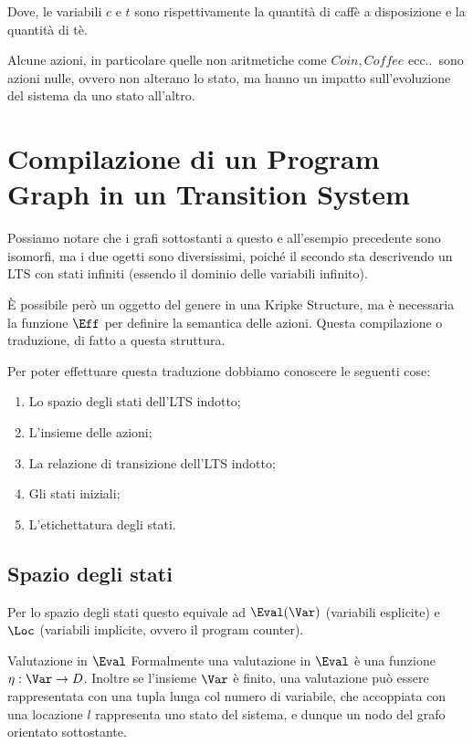 Dove, le variabili \(c\) e \(t\) sono rispettivamente la quantità di caffè a disposizione e la quantità di tè.

Alcune azioni, in particolare quelle non aritmetiche come \(Coin, Coffee\) ecc..\ sono azioni nulle, ovvero non alterano lo stato, ma hanno un impatto sull'evoluzione del sistema da uno stato all'altro.


\section{Compilazione di un Program Graph in un Transition System}

Possiamo notare che i grafi sottostanti a questo  e all'esempio precedente  sono isomorfi, ma i due ogetti sono diversissimi, poiché il secondo sta descrivendo un LTS con stati infiniti (essendo il dominio delle variabili infinito).

È possibile però  un oggetto del genere in una Kripke Structure, ma è necessaria la funzione \(\Eff\) per definire la semantica delle azioni.
Questa compilazione o traduzione, di fatto  a questa struttura.


Per poter effettuare questa traduzione dobbiamo conoscere le seguenti cose:
\begin{enumerate}
  \item Lo spazio degli stati dell'LTS indotto;
  \item L'insieme delle azioni;
  \item La relazione di transizione dell'LTS indotto;
  \item Gli stati iniziali;
  \item L'etichettatura degli stati.
\end{enumerate}

\subsection{Spazio degli stati}
Per lo spazio degli stati questo equivale ad \(\Eval(\Var)\) (variabili esplicite) e \(\Loc\) (variabili implicite, ovvero il program counter).

\begin{definition}{Valutazione in \(\Eval\)}
  Formalmente una valutazione in \(\Eval\) è una funzione \(\eta: \Var \to D\).
  Inoltre se l'insieme \(\Var\) è finito, una valutazione può essere rappresentata con una tupla lunga col numero di variabile, che accoppiata con una locazione \(l\) rappresenta uno stato del sistema, e dunque un nodo del grafo orientato sottostante.
\end{definition}

